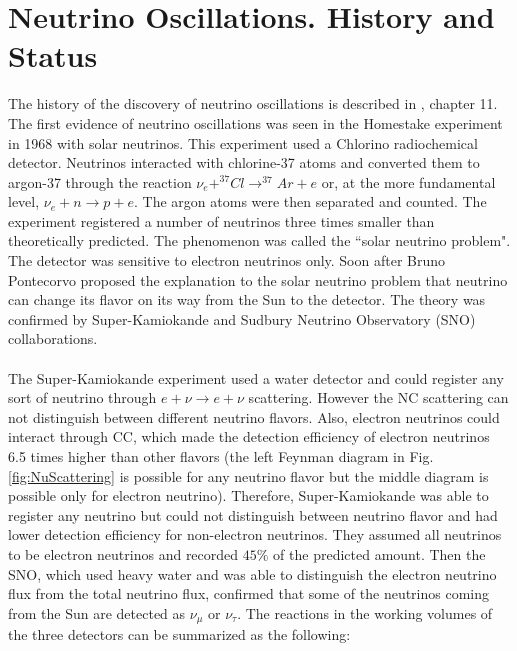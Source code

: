 \section{Neutrino Oscillations. History and Status}

The history of the discovery of neutrino oscillations is described in \cite{ref_Griffiths}, chapter 11. The first evidence of neutrino oscillations was seen in the Homestake experiment in 1968 with solar neutrinos. This experiment used a Chlorino radiochemical detector. Neutrinos interacted with chlorine-37 atoms and converted them to argon-37 through the reaction $\nu_e+^{37}Cl \rightarrow ^{37}Ar+e$ or, at the more fundamental level, $\nu_e+n \rightarrow p+e$. The argon atoms were then separated and counted. The experiment registered a number of neutrinos three times smaller than theoretically predicted. The phenomenon was called the ``solar neutrino problem".  The detector was sensitive to electron neutrinos only. Soon after Bruno Pontecorvo proposed the explanation to the solar neutrino problem that neutrino can change its flavor on its way from the Sun to the detector. The theory was confirmed  by Super-Kamiokande and Sudbury Neutrino Observatory (SNO) collaborations. \\ \\
The Super-Kamiokande experiment used a water detector and could register any sort of neutrino through $e+\nu \rightarrow e+\nu$ scattering. However the NC scattering can not distinguish between different neutrino flavors. Also, electron neutrinos could interact through CC, which made the detection efficiency of electron neutrinos 6.5 times higher than other flavors (the left Feynman diagram in Fig. \ref{fig:NuScattering} is possible for any neutrino flavor but the middle diagram is possible only for electron neutrino). Therefore, Super-Kamiokande was able to register any neutrino but could not distinguish between neutrino flavor and had lower detection efficiency for non-electron neutrinos. They assumed all neutrinos to be electron neutrinos and recorded $45\%$ of the predicted amount. Then the SNO, which used heavy water and was able to distinguish the electron neutrino flux from the total neutrino flux, confirmed that some of the neutrinos coming from the Sun are detected as $\nu_\mu$ or $\nu_\tau$. The reactions in the working volumes of the three detectors can be summarized as the following:\\ 
